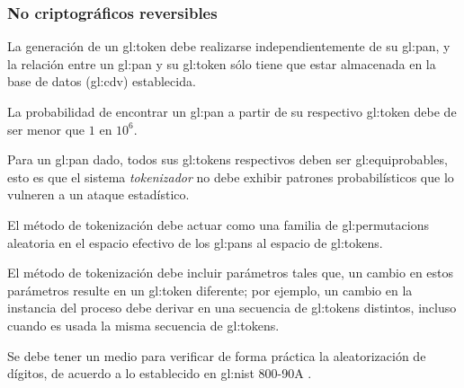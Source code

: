 %
%

\subsubsection{No criptográficos reversibles}

{
  La generación de un \gls{gl:token} debe realizarse independientemente de
  su \gls{gl:pan}, y la relación entre un \gls{gl:pan} y su \gls{gl:token}
  sólo tiene que estar almacenada en la base de datos (\gls{gl:cdv})
  establecida.
}

{
  La probabilidad de encontrar un \gls{gl:pan} a partir de su respectivo
  \gls{gl:token} debe de ser menor que $1$ en $10^6$.

  {
    Para un \gls{gl:pan} dado, todos sus \glspl{gl:token} respectivos
    deben ser \glspl{gl:equiprobable}, esto es que el sistema
    \textit{tokenizador} no debe exhibir patrones probabilísticos que
    lo vulneren a un ataque estadístico.
  }

  {
    El método de tokenización debe actuar como una familia de
    \glspl{gl:permutacion} aleatoria en el espacio efectivo de los
    \glspl{gl:pan} al espacio de \glspl{gl:token}.
  }

  {
    El método de tokenización debe incluir parámetros tales que, un
    cambio en estos parámetros resulte en un \gls{gl:token} diferente;
    por ejemplo, un cambio en la instancia del proceso debe derivar en
    una secuencia de \glspl{gl:token} distintos, incluso cuando es usada
    la misma secuencia de \glspl{gl:token}.
  }


  {
    Se debe tener un medio para verificar de forma práctica la aleatorización
    de dígitos, de acuerdo a lo establecido en \gls{gl:nist} 800-90A
    \cite{nist_aleatorios}.
  }
}

